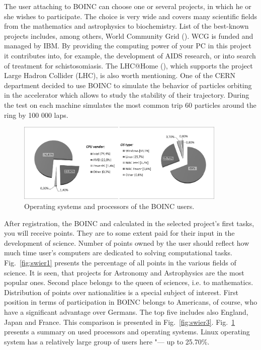 \documentclass[10pt, a5paper]{article}
\begin{document}
The user attaching to BOINC can choose one or several projects, in which he or she wishes to participate. The choice is very wide and covers many scientific fields from the mathematics and astrophysics to biochemistry. List of the best-known projects includes, among others, World Community Grid (\cite{swier2}). WCG is funded and managed by IBM. By providing the computing power of your PC in this project it contributes into, for example, the development of AIDS research, or into search of treatment for schistosomiasis. The LHC@Home (\cite{swier3}), which supports the project Large Hadron Collider (LHC), is also worth mentioning. One of the CERN department  decided to use BOINC to simulate the behavior of particles orbiting in the accelerator which allows to study the stability of their trajectory. During the test on each machine simulates the most common trip 60 particles around the ring by 100 000 laps.

\begin{figure}[h]
  \centering
  \includegraphics[width=10cm]{104_2013_w_Swierczewski_boinc_2}
  \caption{Operating systems and processors of the BOINC users.}\label{fig:swier2}
\end{figure}


After registration, the BOINC and calculated in the selected pro\-ject's first tasks, you will receive points. They are to some extent paid for their input in the development of science.
Number of points owned by the user should reflect how much time user's computers are dedicated to solving computational tasks. Fig.~\ref{fig:swier1} presents the percentage of all points in the various fields of science. It is seen, that projects for Astronomy and Astrophysics are the most popular ones. Second place belongs to the queen of sciences, i.e. to mathematics. Distribution of points over  nationalities is a special subject of interest. First position in terms of participation in BOINC belongs to Americans, of course, who have a significant advantage over Germans. The top five includes also England, Japan and France. This comparison is presented in Fig.~\ref{fig:swier3}. Fig.~\ref{fig:swier2} presents a summary on used processors and operating systems. Linux operating system has a relatively large group of users here "--- up to 25.70\%.
\end{document}

